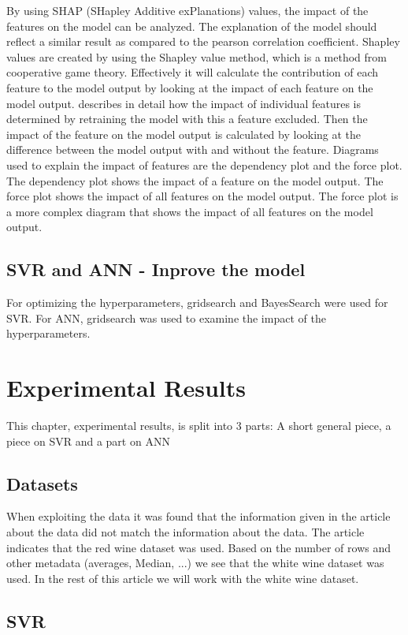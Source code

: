 \documentclass{article}
\begin{document}
By using SHAP (SHapley Additive exPlanations) values, the impact of the features on the model can be analyzed.
The explanation of the model should reflect a similar result as compared to the pearson correlation coefficient.
Shapley values are created by using the Shapley value method, which is a method from cooperative game theory.
Effectively it will calculate the contribution of each feature to the model output by looking at the impact of each feature on the model output.
\cite{lundberg2017unified} describes in detail how the impact of individual features is determined by retraining the model with this a feature excluded.
Then the impact of the feature on the model output is calculated by looking at the difference between the model output with and without the feature.
Diagrams used to explain the impact of features are the dependency plot and the force plot.
The dependency plot shows the impact of a feature on the model output.
The force plot shows the impact of all features on the model output.
The force plot is a more complex diagram that shows the impact of all features on the model output.

\subsection{SVR and ANN - Inprove the model}
For optimizing the hyperparameters, gridsearch and BayesSearch were used for SVR. For ANN, gridsearch was used to examine the impact of the hyperparameters.


\section{Experimental Results}
This chapter, experimental results, is split into 3 parts: A short general piece, a piece on SVR and a part on ANN

\subsection{Datasets}
When exploiting the data it was found that the information given in the article about the data did not match the information about the data. The article indicates that the red wine dataset was used. Based on the number of rows and other metadata (averages, Median, ...) we see that the white wine dataset was used. In the rest of this article we will work with the white wine dataset.

\subsection{SVR}
\end{document}
